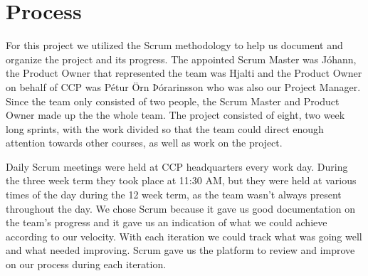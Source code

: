 \section{Process}\label{sec:process}

For this project we utilized the Scrum methodology to help us document and organize the project and its progress. The appointed Scrum Master was Jóhann, the Product Owner that represented the team was Hjalti and the Product Owner on behalf of CCP was Pétur Örn Þórarinsson who was also our Project Manager. Since the team only consisted of two people, the Scrum Master and Product Owner made up the the whole team. The project consisted of eight, two week long sprints, with the work divided so that the team could direct enough attention towards other courses, as well as work on the project.

Daily Scrum meetings were held at CCP headquarters every work day. During the three week term they took place at 11:30 AM, but they were held at various times of the day during the 12 week term, as the team wasn't always present throughout the day. We chose Scrum because it gave us good documentation on the team's progress and it gave us an indication of what we could achieve according to our velocity. With each iteration we could track what was going well and what needed improving. Scrum gave us the platform to review and improve on our process during each iteration.
